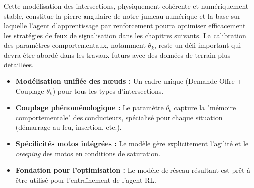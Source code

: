 Cette modélisation des intersections, physiquement cohérente et numériquement stable, constitue la pierre angulaire de notre jumeau numérique et la base sur laquelle l'agent d'apprentissage par renforcement pourra optimiser efficacement les stratégies de feux de signalisation dans les chapitres suivants. La calibration des paramètres comportementaux, notamment $\theta_k$, reste un défi important qui devra être abordé dans les travaux futurs avec des données de terrain plus détaillées.

\begin{keypointsbox}
    \begin{itemize}
        \item \textbf{Modélisation unifiée des nœuds :} Un cadre unique (Demande-Offre + Couplage $\theta_k$) pour tous les types d'intersections.
        \item \textbf{Couplage phénoménologique :} Le paramètre $\theta_k$ capture la "mémoire comportementale" des conducteurs, spécialisé pour chaque situation (démarrage au feu, insertion, etc.).
        \item \textbf{Spécificités motos intégrées :} Le modèle gère explicitement l'agilité et le \textit{creeping} des motos en conditions de saturation.
        \item \textbf{Fondation pour l'optimisation :} Le modèle de réseau résultant est prêt à être utilisé pour l'entraînement de l'agent RL.
    \end{itemize}
\end{keypointsbox}
